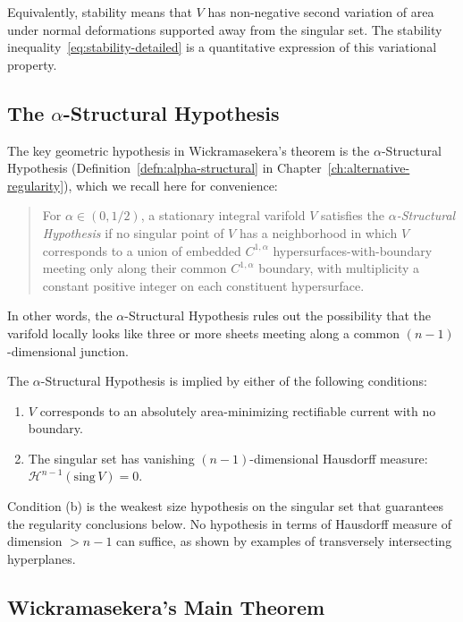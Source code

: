 Equivalently, stability means that $V$ has non-negative second variation of area under normal
deformations supported away from the singular set. The stability inequality~\eqref{eq:stability-detailed}
is a quantitative expression of this variational property.

\subsection{The $\alpha$-Structural Hypothesis}

The key geometric hypothesis in Wickramasekera's theorem is the $\alpha$-Structural Hypothesis (Definition~\ref{defn:alpha-structural} in Chapter~\ref{ch:alternative-regularity}), which we recall here for convenience:

\begin{quote}
For $\alpha \in (0, 1/2)$, a stationary integral varifold $V$ satisfies the \emph{$\alpha$-Structural Hypothesis} if no singular point of $V$ has a neighborhood in which $V$ corresponds to a union of embedded $C^{1,\alpha}$ hypersurfaces-with-boundary meeting only along their common $C^{1,\alpha}$ boundary, with multiplicity a constant positive integer on each constituent hypersurface.
\end{quote}

In other words, the $\alpha$-Structural Hypothesis rules out the possibility that the varifold
locally looks like three or more sheets meeting along a common $(n-1)$-dimensional junction.

\begin{remark}
The $\alpha$-Structural Hypothesis is implied by either of the following conditions:
\begin{enumerate}[label=(\alph*)]
\item $V$ corresponds to an absolutely area-minimizing rectifiable current with no boundary.
\item The singular set has vanishing $(n-1)$-dimensional Hausdorff measure:
${\mathcal H}^{n-1}(\mathrm{sing}\, V) = 0$.
\end{enumerate}
Condition (b) is the weakest size hypothesis on the singular set that guarantees the regularity
conclusions below. No hypothesis in terms of Hausdorff measure of dimension $> n-1$ can suffice,
as shown by examples of transversely intersecting hyperplanes.
\end{remark}

\subsection{Wickramasekera's Main Theorem}

